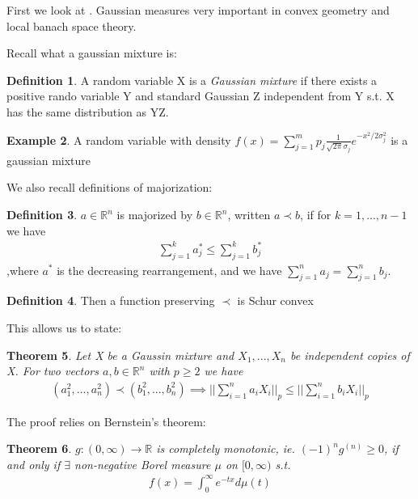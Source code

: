 \documentclass[10pt]{article}
\newcommand{\1}{\textbf{1}}
\newcommand{\R}{\mathbb{R}}
\newtheorem{theorem}{Theorem}
\theoremstyle{remark}
\theoremstyle{definition}
\newtheorem{defn}[theorem]{Definition}
\newtheorem{exmp}[theorem]{Example}
\begin{document}
First we look at \cite{ENT}. Gaussian measures very important in convex geometry and local banach space theory. 

Recall what a gaussian mixture is:

\begin{defn}
	A random variable X is a \textit{Gaussian mixture} if there exists a positive rando variable Y and standard Gaussian Z independent from Y s.t. X has the same distribution as YZ.
\end{defn}

\begin{exmp}
	A random variable with density $f(x) = \sum_{j=1}^m p_j \frac{1}{\sqrt{2\pi}\sigma_j}e^{-x^2/2\sigma_j^2}$ is a gaussian mixture
\end{exmp}

We also recall definitions of majorization:

\begin{defn}
	$a \in \R^n$ is majorized by $b \in \R^n$, written $a \prec b$, if for $k = 1,...,n-1$ we have 
	\begin{align*}
		\sum_{j=1}^k a_j^* \leq \sum_{j=1}^k b_j^*
	\end{align*}
	,where $a^*$ is the decreasing rearrangement, and we have $\sum_{j=1}^n a_j = \sum_{j=1}^n b_j$. 
\end{defn}

\begin{defn}
	Then a function preserving $\prec$ is Schur convex
\end{defn}

This allows us to state:

\begin{theorem}
	Let X be a Gaussin mixture and $X_1,...,X_n$ be independent copies of X. For two vectors $a,b \in \R^n$ with $p \geq 2$ we have
	\begin{align*}
		(a_1^2,...,a_n^2) \prec (b_1^2,...,b_n^2) \implies ||\sum_{i=1}^n a_iX_i||_p \leq ||\sum_{i=1}^n b_iX_i||_p
	\end{align*}
\end{theorem}


The proof relies on Bernstein's theorem:

\begin{theorem}
	$g : (0,\infty) \to \R$ is completely monotonic, ie. $(-1)^ng^{(n)} \geq 0$, if and only if $\exists$ non-negative Borel measure $\mu$ on $[0,\infty)$ s.t.
	\begin{align*}
		f(x) = \int_0^{\infty} e^{-tx}d\mu(t)
	\end{align*}
\end{theorem}
\end{document}

